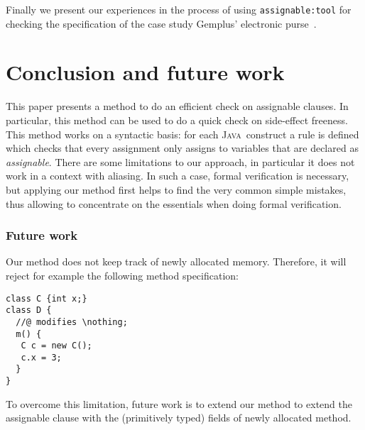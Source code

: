 \documentclass[a4paper]{llncs}
\newcommand{\escj}{\textsc{Esc/Java}}
\newcommand{\java}{\textsc{Java}}
\newcommand{\modtool}{\texttt{assignable:tool}}
\newcommand{\fieldsof}{\texttt{\(\backslash\)fields\_of}}
\newcommand{\reach}{\texttt{\(\backslash\)reach}}
\newcommand{\nothing}{\texttt{\(\backslash\)nothing}}
\begin{document}
Finally we present our experiences in the process of using \modtool
for checking the specification of the case study Gemplus' electronic
purse~\cite{CatanoH02a}. 




\section{Conclusion and future work}
\label{sec-con-and-fut-wor}
This paper presents a method to do an efficient check on assignable
clauses. In particular, this method can be used to do a quick check on 
side-effect freeness.
This method works on a syntactic basis: 
for each \java\ construct a rule is defined which checks that every
assignment only assigns to variables that are declared as 
\emph{assignable}. There are some limitations to our approach, in
particular it does not work in a context with aliasing. In such a
case, formal verification is necessary, but applying our method first
helps to find the very common simple mistakes, thus allowing to
concentrate on the essentials when doing formal verification.


\subsubsection{Future work}
Our method does not keep track of newly allocated memory. Therefore,
it will reject for example the following method specification:
\begin{verbatim}
class C {int x;}
class D {
  //@ modifies \nothing;
  m() {
   C c = new C();
   c.x = 3;
  }
}
\end{verbatim}
To overcome this limitation, future work is to extend our method to extend the
assignable clause with the (primitively typed) fields of newly
allocated method.
\end{document}

